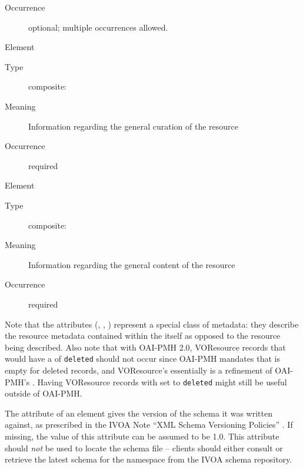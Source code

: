 \documentclass[11pt,a4paper]{ivoa}
\begin{document}
\begin{generated}
\begin{bigdescription}
\begin{description}
\item[Occurrence] optional; multiple occurrences allowed.

\end{description}
\item[Element \xmlel{curation}]
\begin{description}
\item[Type] composite: 
\item[Meaning] 
               Information regarding the general curation of the resource
             
\item[Occurrence] required

\end{description}
\item[Element \xmlel{content}]
\begin{description}
\item[Type] composite: 
\item[Meaning] 
               Information regarding the general content of the resource
             
\item[Occurrence] required

\end{description}


\end{bigdescription}\endgroup

\endgroup
\end{generated}


Note that the  attributes (,
, ) represent a special class of
metadata: they describe the resource metadata contained
within the  itself as opposed to the resource being
described.  Also note that with OAI-PMH 2.0, VOResource records that
would have a  of \verb|deleted| should not occur since
OAI-PMH mandates that  is empty for deleted
records, and VOResource's  essentially is a refinement of
OAI-PMH's .  Having VOResource records with 
set to \verb|deleted| might still be useful outside of OAI-PMH.

The  attribute of an  element gives
the version of the schema it was written against, as prescribed in the
IVOA Note ``XML Schema Versioning Policies''
\citep{note:schemaevolution}.  If missing, the value of this attribute
can be assumed to be 1.0.  This attribute should \emph{not} be used to
locate the schema file -- clients should either consult
 or retrieve the latest schema for the 
namespace from the IVOA schema repository.
\end{document}
